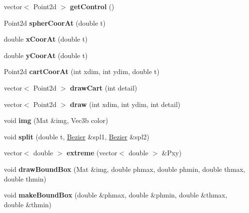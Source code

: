 \begin{DoxyCompactItemize}
\mbox{\label{class_bezier_a6fb25addeb2be19d135731c9cf5b9caf}} 
vector$<$ Point2d $>$ {\bfseries get\+Control} ()
\item 
\mbox{\label{class_bezier_a8056710b048b0f319955bba3cf9dd7e8}} 
Point2d {\bfseries spher\+Coor\+At} (double t)
\item 
\mbox{\label{class_bezier_a4ffb77b548f410b8c20871ae60680b73}} 
double {\bfseries x\+Coor\+At} (double t)
\item 
\mbox{\label{class_bezier_a590f4b08332ff11e1e2dac3a37e7d795}} 
double {\bfseries y\+Coor\+At} (double t)
\item 
\mbox{\label{class_bezier_ae77942179c15da09dc6e64ab72a1b9ab}} 
Point2d {\bfseries cart\+Coor\+At} (int xdim, int ydim, double t)
\item 
\mbox{\label{class_bezier_a570c7088dc54f8ccafb20a004b39004e}} 
vector$<$ Point2d $>$ {\bfseries draw\+Cart} (int detail)
\item 
\mbox{\label{class_bezier_aa28c8477517d5295cf46d05a5f6aa2f1}} 
vector$<$ Point2d $>$ {\bfseries draw} (int xdim, int ydim, int detail)
\item 
\mbox{\label{class_bezier_a047d8518880f309bbe6bf6ff1c7af72f}} 
void {\bfseries img} (Mat \&img, Vec3b color)
\item 
\mbox{\label{class_bezier_acf90d86ce38ff32667d46f9a282a6114}} 
void {\bfseries split} (double t, \mbox{\hyperlink{class_bezier}{Bezier}} \&spl1, \mbox{\hyperlink{class_bezier}{Bezier}} \&spl2)
\item 
\mbox{\label{class_bezier_ab651d2e27b025df657df0934aa4223ba}} 
vector$<$ double $>$ {\bfseries extreme} (vector$<$ double $>$ \&Pxy)
\item 
\mbox{\label{class_bezier_a42507f255d792bc779720250d6a54020}} 
void {\bfseries draw\+Bound\+Box} (Mat \&img, double phmax, double phmin, double thmax, double thmin)
\item 
\mbox{\label{class_bezier_aa9aa9edb2786f7de83485ba672f98af6}} 
void {\bfseries make\+Bound\+Box} (double \&phmax, double \&phmin, double \&thmax, double \&thmin)
\end{DoxyCompactItemize}
